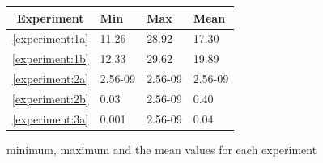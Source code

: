 \documentclass{article}
\begin{document}
\begin{figure}[!htbp]
	\begin{tabular}{||c|||l|l|l||}
		\hline
		Experiment & Min & Max & Mean \\ \hline \hline
		\ref{experiment:1a} & 11.26 & 28.92 & 17.30 \\ \hline
		\ref{experiment:1b} & 12.33 & 29.62 & 19.89 \\ \hline
		\ref{experiment:2a} & 2.56-09 & 2.56-09 & 2.56-09 \\ \hline
		\ref{experiment:2b} & 0.03 & 2.56-09 & 0.40 \\ \hline
		\ref{experiment:3a} & 0.001 & 2.56-09 & 0.04 \\ \hline
	\end{tabular}
	\caption{minimum, maximum and the mean values for each experiment}
\end{figure}
\FloatBarrier
\end{document}
